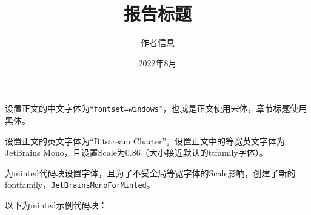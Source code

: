 \documentclass[a4paper]{report}
\title{报告标题}
\author{作者信息}
\date{2022年8月}
\begin{document}
设置正文的中文字体为“\verb+fontset=windows+”，也就是正文使用宋体，章节标题使用黑体。

设置正文的英文字体为“Bitstream Charter”。设置正文中的等宽英文字体为JetBrains Mono，且设置Scale为0.86（大小接近默认的ttfamily字体）。

为minted代码块设置字体，且为了不受全局等宽字体的Scale影响，创建了新的fontfamily，\verb+JetBrainsMonoForMinted+。

以下为minted示例代码块：

\inputminted{cpp}{./add.cpp}
\end{document}
